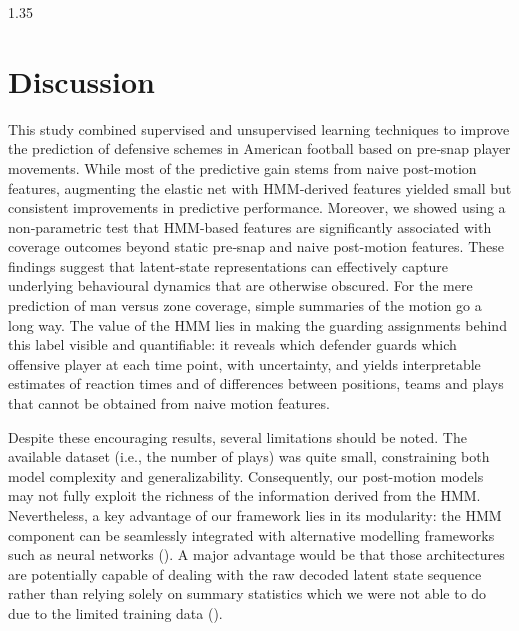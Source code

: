 \documentclass[12pt,a4paper]{article}
\begin{document}
\begin{spacing}{1.35}

\section{Discussion}\label{sec:discussion}

This study combined supervised and unsupervised learning techniques to improve the prediction of defensive schemes in American football based on pre‑snap player movements. While most of the predictive gain stems from naive post-motion features, augmenting the elastic net with HMM‑derived features yielded small but consistent improvements in predictive performance. Moreover, we showed using a non‑parametric test that HMM-based features are significantly associated with coverage outcomes beyond static pre‑snap and naive post-motion features. These findings suggest that latent‑state representations can effectively capture underlying behavioural dynamics that are otherwise obscured. For the mere prediction of man versus zone coverage, simple summaries of the motion go a long way. The value of the HMM lies in making the guarding assignments behind this label visible and quantifiable: it reveals which defender guards which offensive player at each time point, with uncertainty, and yields interpretable estimates of reaction times and of differences between positions, teams and plays that cannot be obtained from naive motion features.

Despite these encouraging results, several limitations should be noted. The available dataset (i.e., the number of plays) was quite small, constraining both model complexity and generalizability. Consequently, our post-motion models may not fully exploit the richness of the information derived from the HMM. Nevertheless, a key advantage of our framework lies in its modularity: the HMM component can be seamlessly integrated with alternative modelling frameworks such as neural networks (\citealp{Song2023}). A major advantage would be that those architectures are potentially capable of dealing with the raw decoded latent state sequence rather than relying solely on summary statistics which we were not able to do due to the limited training data (\citealp{dempster2020rocket}). 


\end{spacing}
\end{document}
